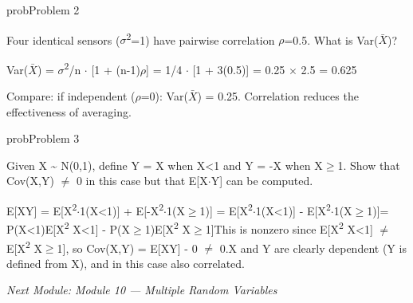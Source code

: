 \begin{PSbox}[unbreakable]{prob}{Problem 2}

Four identical sensors (\ensuremath{\sigma}\textsuperscript{2}=1) have pairwise correlation \ensuremath{\rho}=0.5. What is Var(\ensuremath{\bar{X}})?

\PSsolution{} Var(\ensuremath{\bar{X}}) = \ensuremath{\sigma}\textsuperscript{2}/n \ensuremath{\cdot} [1 + (n-1)\ensuremath{\rho}] = 1/4 \ensuremath{\cdot} [1 + 3(0.5)] = 0.25 \ensuremath{\times} 2.5 = 0.625

Compare: if independent (\ensuremath{\rho}=0): Var(\ensuremath{\bar{X}}) = 0.25. Correlation reduces the effectiveness of averaging.

\end{PSbox}

\begin{PSbox}[unbreakable]{prob}{Problem 3}

Given X \textasciitilde{} N(0,1), define Y = X when \textbar{}X\textbar{}\textless{}1 and Y = -X when \textbar{}X\textbar{}\ensuremath{\ge}1. Show that Cov(X,Y) \ensuremath{\neq} 0 in this case but that E[X\ensuremath{\cdot}Y] can be computed.

\PSsolution{} E[XY] = E[X\textsuperscript{2}\ensuremath{\cdot}1(\textbar{}X\textbar{}\textless{}1)] + E[-X\textsuperscript{2}\ensuremath{\cdot}1(\textbar{}X\textbar{}\ensuremath{\ge}1)] = E[X\textsuperscript{2}\ensuremath{\cdot}1(\textbar{}X\textbar{}\textless{}1)] - E[X\textsuperscript{2}\ensuremath{\cdot}1(\textbar{}X\textbar{}\ensuremath{\ge}1)]\PSbr{}= P(\textbar{}X\textbar{}\textless{}1)E[X\textsuperscript{2}\textbar{} \textbar{}X\textbar{}\textless{}1] - P(\textbar{}X\textbar{}\ensuremath{\ge}1)E[X\textsuperscript{2}\textbar{} \textbar{}X\textbar{}\ensuremath{\ge}1]\PSbr{}This is nonzero since E[X\textsuperscript{2}\textbar{} \textbar{}X\textbar{}\textless{}1] \ensuremath{\neq} E[X\textsuperscript{2}\textbar{} \textbar{}X\textbar{}\ensuremath{\ge}1], so Cov(X,Y) = E[XY] - 0 \ensuremath{\neq} 0.\PSbr{}X and Y are clearly dependent (Y is defined from X), and in this case also correlated.

\emph{Next Module: {Module 10 — Multiple Random Variables}}

\end{PSbox}
